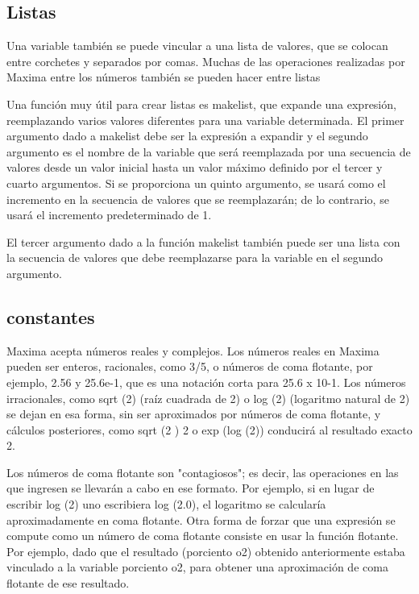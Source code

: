 \documentclass{article}
\begin{document}
\subsection{Listas}

Una variable también se puede vincular a una lista de valores, que se colocan entre corchetes y separados por comas. Muchas de las operaciones realizadas por Maxima entre los números también se pueden hacer entre listas

Una función muy útil para crear listas es makelist, que expande una expresión, reemplazando varios valores diferentes para una variable determinada. El primer argumento dado a makelist debe ser la expresión a expandir y el segundo argumento es el nombre de la variable que será reemplazada por una secuencia de valores desde un valor inicial hasta un valor máximo definido por el tercer y cuarto argumentos. Si se proporciona un quinto argumento, se usará como el incremento en la secuencia de valores que se reemplazarán; de lo contrario, se usará el incremento predeterminado de 1.

El tercer argumento dado a la función makelist también puede ser una lista con la secuencia de valores que debe reemplazarse para la variable en el segundo argumento.





\subsection{constantes}

Maxima acepta números reales y complejos. Los números reales en Maxima pueden ser enteros, racionales, como 3/5, o números de coma flotante, por ejemplo, 2.56 y 25.6e-1, que es una notación corta para 25.6 x 10-1. Los números irracionales, como sqrt (2) (raíz cuadrada de 2) o log (2) (logaritmo natural de 2) se dejan en esa forma, sin ser aproximados por números de coma flotante, y cálculos posteriores, como sqrt (2 )  2 o exp (log (2)) conducirá al resultado exacto 2.

Los números de coma flotante son "contagiosos"; es decir, las operaciones en las que ingresen se llevarán a cabo en ese formato. Por ejemplo, si en lugar de escribir log (2) uno escribiera log (2.0), el logaritmo se calcularía aproximadamente en coma flotante. Otra forma de forzar que una expresión se compute como un número de coma flotante consiste en usar la función flotante. Por ejemplo, dado que el resultado (porciento o2) obtenido anteriormente estaba vinculado a la variable porciento o2, para obtener una aproximación de coma flotante de ese resultado.
\end{document}
